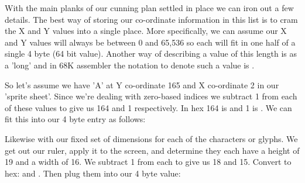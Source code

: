 With the main planks of our cunning plan settled in place we can iron out a few details. The best way of storing our co-ordinate information
in this list is to cram the X and Y values into a single place. More specifically, we can assume our X and Y values will always be between
0 and 65,536 so each will fit in one half of a single 4 byte (64 bit value). Another way of describing a value of this length is as a 'long'
and in 68K assembler the notation to denote such a value is .

So let's assume we have 'A' at Y co-ordinate 165 and X co-ordinate 2 in our  'sprite sheet'. Since we're dealing with zero-based indices
we subtract 1 from each of these values to give us 164 and 1 respectively. In hex 164 is  and 1 is 
. We can fit this into our 4 byte entry as follows:

\begin{figure}[H]
  {
    \setlength{\tabcolsep}{3.0pt}
    \setlength\cmidrulewidth{\lightrulewidth} %
    \begin{adjustbox}{width=3cm,center}
    \end{adjustbox}
  }
\end{figure}
\vspace{-1cm}

Likewise with our fixed set of dimensions for each of the characters or glyphs. We get out our ruler, apply it to the screen, and determine they
each have a height of 19 and a width of 16. We subtract 1 from each to give us 18 and 15. Convert to hex:  and . Then
plug them into our 4 byte value:

